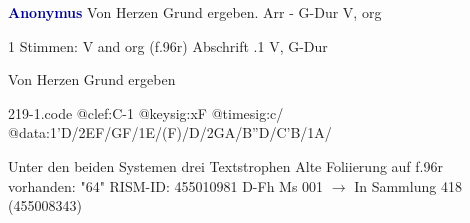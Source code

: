 \documentclass[twocolumn]{book}
\begin{document}
\newline \par \vspace{7pt} \textcolor{darkblue}{\textbf{Anonymus  }}
\newline Von Herzen Grund ergeben. Arr - G-Dur
\newline V, org
\newline \begin{itshape}\end{itshape} 
\newline \textcolor{darkblue}{}  1 Stimmen: V and org  (f.96r)
\newline Abschrift
.1  V, G-Dur
\newline \begin{footnotesize} Von Herzen Grund ergeben \end{footnotesize}  
\begin{filecontents*}{219-1.code}
@clef:C-1
@keysig:xF
@timesig:c/
@data:1'D/2EF/GF/1E/(F)/D/2GA/B''D/C'B/1A/
\end{filecontents*}
\newline
%
\newline Unter den beiden Systemen drei Textstrophen
\newline Alte Foliierung auf f.96r vorhanden: "64"
\newline RISM-ID: 455010981
\newline D-Fh  Ms 001
\newline $\rightarrow$ In Sammlung 418 (455008343)
      
\end{document}
